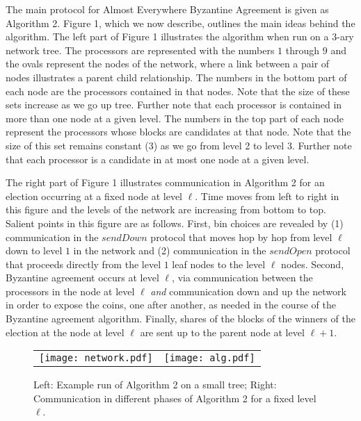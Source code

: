 \documentclass[letterpaper,11pt]{article}
\begin{document}
The main protocol for Almost Everywhere Byzantine Agreement is given as Algorithm 2.  Figure 1, which we now describe, outlines the main ideas behind the algorithm.  The left part of Figure 1 illustrates the algorithm when run on a 3-ary network tree.  The processors are represented with the numbers $1$ through $9$ and the ovals represent the nodes of the network, where a link between a pair of nodes illustrates a parent child relationship.  The numbers in the bottom part of each node are the processors contained in that nodes.  Note that the size of these sets increase as we go up tree.  Further note that each processor is contained in more than one node at a given level.  The numbers in the top part of each node represent the processors whose blocks are candidates at that node.  Note that the size of this set remains constant ($3$) as we go from level 2 to level 3.  Further note that each processor is a candidate in at most one node at a given level.

The right part of Figure 1 illustrates communication in Algorithm 2 for an election occurring at a fixed node at level $\ell$.  Time moves from left to right in this figure and the levels of the network are increasing from bottom to top.  Salient points in this figure are as follows.   First, bin choices are revealed by (1) communication in the $sendDown$ protocol that moves hop by hop from level $\ell$ down to level $1$ in the network and (2) communication in the $sendOpen$ protocol that proceeds directly from the level $1$ leaf nodes to the level $\ell$ nodes.  Second, Byzantine agreement occurs at level $\ell$, via communication between the processors in the node at level $\ell$ \emph{and} communication down and up the network in order to expose the coins, one after another, as needed in the course of the Byzantine agreement algorithm.  Finally, shares of the blocks of the winners of the election at the node at level $\ell$ are sent up to the parent node at level $\ell+1$.

\begin{figure}[t]
\begin{center}
\begin{tabular}{ll}
\texttt{[image: network.pdf]} &
\texttt{[image: alg.pdf]}
\end{tabular}
\caption{Left: Example run of Algorithm 2 on a small tree; Right: Communication in different phases of Algorithm 2 for a fixed level $\ell$. }
\end{center}
\label{f:aeBA}
\end{figure}
\end{document}
